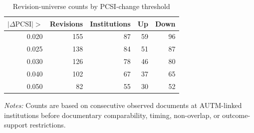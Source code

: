 \begin{table}[htbp]\centering
\caption{Revision-universe counts by PCSI-change threshold}\label{tab:thresholduniverse}
\begin{threeparttable}\small
\begin{tabular}{rrrrr}\toprule
$|\Delta\mathrm{PCSI}|>$ & Revisions & Institutions & Up & Down \\\midrule
0.020 & 155 & 87 & 59 & 96 \\
0.025 & 138 & 84 & 51 & 87 \\
0.030 & 126 & 78 & 46 & 80 \\
0.040 & 102 & 67 & 37 & 65 \\
0.050 & 82 & 55 & 30 & 52 \\
\bottomrule
\end{tabular}
\begin{tablenotes}[flushleft]\footnotesize
\item \textit{Notes:} Counts are based on consecutive observed documents at AUTM-linked institutions before documentary
comparability, timing, non-overlap, or outcome-support restrictions.
\end{tablenotes}
\end{threeparttable}
\end{table}
